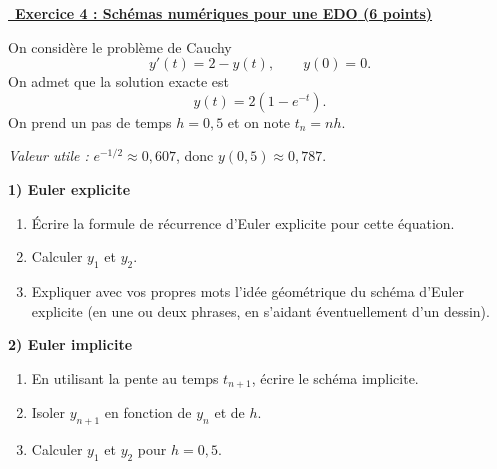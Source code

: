 \vspace{1em}

\underline{\, \bf{Exercice 4 : Schémas numériques pour une EDO} \bf{(6 points)}}
\medskip

On considère le problème de Cauchy
\[
y'(t)=2-y(t),\qquad y(0)=0.
\]
On admet que la solution exacte est
\[
y(t)=2\left(1-e^{-t}\right).
\]
On prend un pas de temps $h=0{,}5$ et on note $t_n=nh$.

\medskip

\textit{Valeur utile :} $e^{-1/2}\approx 0{,}607$, donc $y(0{,}5)\approx 0{,}787$.

\medskip

\textbf{1) Euler explicite}
\begin{enumerate}
    \item Écrire la formule de récurrence d'Euler explicite pour cette équation.
    \item Calculer $y_1$ et $y_2$.
    \item Expliquer avec vos propres mots l'idée géométrique du schéma d'Euler explicite (en une ou deux phrases, en s'aidant éventuellement d'un dessin).
\end{enumerate}

\medskip

\textbf{2) Euler implicite}
\begin{enumerate}
    \item En utilisant la pente au temps $t_{n+1}$, écrire le schéma implicite.
    \item Isoler $y_{n+1}$ en fonction de $y_n$ et de $h$.
    \item Calculer $y_1$ et $y_2$ pour $h=0{,}5$.
\end{enumerate}

